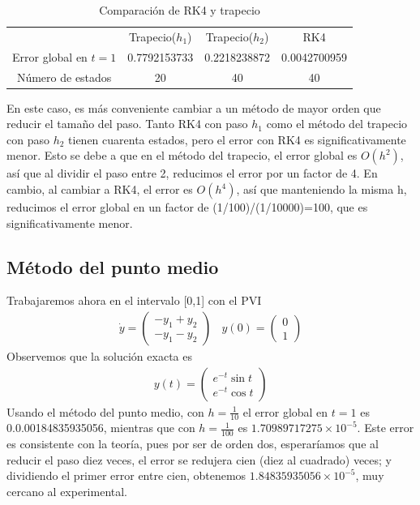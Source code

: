 \documentclass[spanish]{article}
\begin{document}
\begin{table}[h]
\caption{Comparación de RK4 y trapecio}
\centering
\begin{tabular}{cccc}
\hline \hline
$ $ & Trapecio($h_1$) & Trapecio($h_2$) & RK4 \\
Error global en $t=1$ & 0.7792153733  &  0.2218238872 & 0.0042700959 \\
Número de estados  &     20       &       40       &       40 \\
\hline
\end{tabular}
\end{table}
En este caso, es más conveniente cambiar a un método de mayor orden que reducir el
tamaño del paso. Tanto RK4 con paso $h_1$ como el método del trapecio con paso 
$h_2$ tienen cuarenta estados, pero el error con RK4 es significativamente menor.
Esto se debe a que en el método del trapecio, el error global es $O(h^2)$, así que al dividir el paso entre 2, reducimos el error por un factor de 4. En cambio, al 
cambiar a RK4, el error es $O(h^4)$, así que manteniendo  la misma h, reducimos el 
error global en un factor de (1/100)/(1/10000)=100, que es significativamente menor.

\noindent
\subsection{Método del punto medio}
Trabajaremos ahora en el intervalo [0,1] con el PVI 
\begin{align*}
\dot{y} = \begin{pmatrix}
-y_1+y_2 \\
-y_1-y_2
\end{pmatrix}
\ \ \ \ y(0) = \begin{pmatrix}
0  \\ 1
\end{pmatrix}
\end{align*}
Observemos que la solución exacta es 
\begin{align*}
y(t) = \begin{pmatrix}
e^{-t}\sin t\\
e^{-t} \cos t
\end{pmatrix}
\end{align*}
Usando el método del punto medio, con $h = \frac{1}{10}$ el error global en $t=1$ es  
0.0.00184835935056, mientras que con $h = \frac{1}{100}$ es $1.70989717275 \times 	
10^{-5}.$ Este error es consistente con la teoría, pues por ser de orden dos,
esperaríamos que al reducir el paso diez veces, el error se redujera cien (diez al 
cuadrado) veces; y dividiendo el primer error entre cien, obtenemos $1.84835935056
\times 10^{-5}$, muy cercano al experimental.
\end{document}
